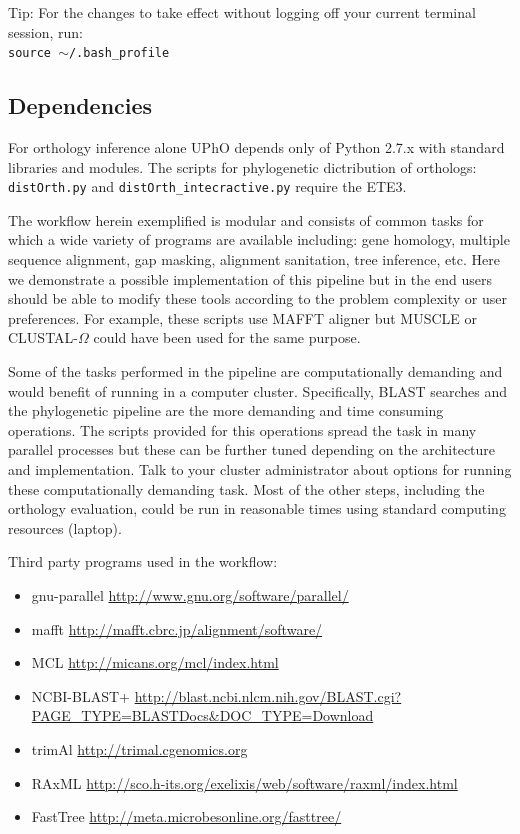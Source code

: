 \documentclass[10pt]{article}
\begin{document}
Tip: For the changes to take effect without logging off your current terminal session, run:\\
\texttt{source $\sim$/.bash\_profile}

\subsection{Dependencies}
For orthology inference alone UPhO depends only of Python 2.7.x with standard libraries and modules. The scripts for phylogenetic dictribution of orthologs: \texttt{distOrth.py} and \texttt{distOrth\_intecractive.py} require the ETE3.


The workflow herein exemplified is modular and  consists of common tasks for which a wide variety of
programs are available including: gene homology, multiple sequence
alignment, gap masking, alignment sanitation, tree inference,
etc. Here we demonstrate a possible implementation of this pipeline
but in the end users should be able to modify these tools according to
the problem complexity or user preferences. For example, these scripts use
MAFFT aligner but MUSCLE \citep{Edgar04} or CLUSTAL-$\Omega$ \citep{Sievers539} could have been used for the same purpose.

Some of the tasks performed in the pipeline are computationally demanding 
and would benefit of running in a computer cluster. Specifically,
BLAST searches and the phylogenetic pipeline are the more demanding
and time consuming operations. The scripts provided for this operations
spread the task in many parallel processes but these can be further tuned
depending on the architecture and implementation. Talk to your cluster administrator
about options for running these computationally demanding task. 
Most of the other steps, including the orthology evaluation, 
could be run in reasonable times using standard computing resources (laptop).

Third party programs used in the workflow:

\begin{itemize}
\item{gnu-parallel} \citep{Tange2011}
\url{http://www.gnu.org/software/parallel/}
\item{mafft} \citep{Katoh2013}
\url{http://mafft.cbrc.jp/alignment/software/}
\item{MCL} \citep{vanDongen2000} \url{http://micans.org/mcl/index.html}
\item{NCBI-BLAST+} \citep{Camacho2009}
\url{http://blast.ncbi.nlcm.nih.gov/BLAST.cgi?PAGE_TYPE=BLASTDocs&DOC_TYPE=Download}
\item{trimAl} \citep{Capella-Gutierrez2009} \url{http://trimal.cgenomics.org}
\item{RAxML} \citep{Stamatakis2014}
\url{http://sco.h-its.org/exelixis/web/software/raxml/index.html}
\item{FastTree} \citep{Price2010}\url{http://meta.microbesonline.org/fasttree/}
\end{itemize}
\end{document}
